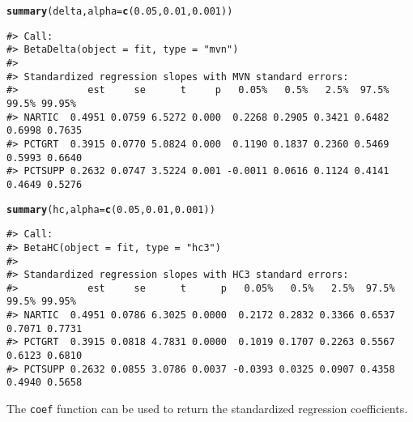 \documentclass[man]{apa7}\usepackage[]{graphicx}\usepackage[]{xcolor}
\makeatletter
\newcommand{\hlnum}[1]{\textcolor[rgb]{0.686,0.059,0.569}{#1}}%
\newcommand{\hlstd}[1]{\textcolor[rgb]{0.345,0.345,0.345}{#1}}%
\newcommand{\hlkwc}[1]{\textcolor[rgb]{0.333,0.667,0.333}{#1}}%
\newcommand{\hlkwd}[1]{\textcolor[rgb]{0.737,0.353,0.396}{\textbf{#1}}}%
\newenvironment{kframe}{%
 \def\at@end@of@kframe{}%
 \ifinner\ifhmode%
  \def\at@end@of@kframe{\end{minipage}}%
  \begin{minipage}{\columnwidth}%
 \fi\fi%
 \def\FrameCommand##1{\hskip\@totalleftmargin \hskip-\fboxsep
 \colorbox{shadecolor}{##1}\hskip-\fboxsep
     \hskip-\linewidth \hskip-\@totalleftmargin \hskip\columnwidth}%
 \MakeFramed {\advance\hsize-\width
   \@totalleftmargin\z@ \linewidth\hsize
   \@setminipage}}%
 {\par\unskip\endMakeFramed%
 \at@end@of@kframe}
\newenvironment{knitrout}{}{} %
\makeatother
\begin{document}
\vspace{-.5em}
\begin{minipage}{.75\linewidth}
	\singlespacing
\begin{knitrout}\scriptsize
{}\color{fgcolor}\begin{kframe}
\begin{alltt}
\hlkwd{summary}\hlstd{(delta,} \hlkwc{alpha} \hlstd{=} \hlkwd{c}\hlstd{(}\hlnum{0.05}\hlstd{,} \hlnum{0.01}\hlstd{,} \hlnum{0.001}\hlstd{))}
\end{alltt}
\begin{verbatim}
#> Call:
#> BetaDelta(object = fit, type = "mvn")
#> 
#> Standardized regression slopes with MVN standard errors:
#>            est     se      t     p   0.05%   0.5%   2.5%  97.5%  99.5% 99.95%
#> NARTIC  0.4951 0.0759 6.5272 0.000  0.2268 0.2905 0.3421 0.6482 0.6998 0.7635
#> PCTGRT  0.3915 0.0770 5.0824 0.000  0.1190 0.1837 0.2360 0.5469 0.5993 0.6640
#> PCTSUPP 0.2632 0.0747 3.5224 0.001 -0.0011 0.0616 0.1124 0.4141 0.4649 0.5276
\end{verbatim}
\begin{alltt}
\hlkwd{summary}\hlstd{(hc,} \hlkwc{alpha} \hlstd{=} \hlkwd{c}\hlstd{(}\hlnum{0.05}\hlstd{,} \hlnum{0.01}\hlstd{,} \hlnum{0.001}\hlstd{))}
\end{alltt}
\begin{verbatim}
#> Call:
#> BetaHC(object = fit, type = "hc3")
#> 
#> Standardized regression slopes with HC3 standard errors:
#>            est     se      t      p   0.05%   0.5%   2.5%  97.5%  99.5% 99.95%
#> NARTIC  0.4951 0.0786 6.3025 0.0000  0.2172 0.2832 0.3366 0.6537 0.7071 0.7731
#> PCTGRT  0.3915 0.0818 4.7831 0.0000  0.1019 0.1707 0.2263 0.5567 0.6123 0.6810
#> PCTSUPP 0.2632 0.0855 3.0786 0.0037 -0.0393 0.0325 0.0907 0.4358 0.4940 0.5658
\end{verbatim}
\end{kframe}
\end{knitrout}
\end{minipage}

\noindent The \texttt{coef} function can be used to return
the standardized regression coefficients.
\end{document}
